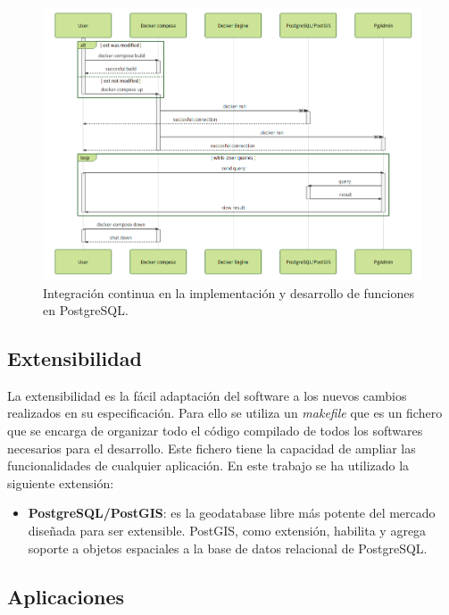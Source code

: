\begin{figure}
\begin{center}
\includegraphics[width=\textwidth]{Metodologia/Figs/ci.png}
\caption{Integración continua en la implementación y desarrollo de funciones en PostgreSQL. \label{fig:ci}}
\end{center}
\end{figure}


\subsection{Extensibilidad}\label{subsec:exten}

La extensibilidad es la fácil adaptación del software a los nuevos cambios realizados en su especificación. Para ello se utiliza un \textit{makefile} que es un fichero que se encarga de organizar todo el código compilado de todos los softwares necesarios para el desarrollo. Este fichero tiene la capacidad de ampliar las funcionalidades de cualquier aplicación. En este trabajo se ha utilizado la siguiente extensión:

\begin{itemize}
\item\textbf{PostgreSQL/PostGIS}: es la geodatabase libre más potente del mercado diseñada para ser extensible. PostGIS, como extensión, habilita y agrega soporte a objetos espaciales a la base de datos relacional de PostgreSQL.
\end{itemize}


\subsection{Aplicaciones}\label{subsec:aplic}

